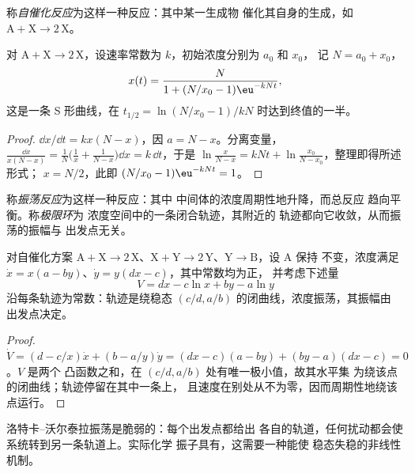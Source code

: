 \begin{definition}[自催化反应]\label{def:b3:complex-kinetics:autocatalysis}
称\emph{自催化反应}为这样一种反应：其中某一生成物
催化其自身的生成，如 $\mathrm{A + X \to 2\,X}$。
\end{definition}

\begin{proposition}[逻辑斯谛定律]\label{prop:b3:complex-kinetics:logistic}
对 $\mathrm{A + X \to 2\,X}$，设速率常数为 $k$，初始浓度分别为 $a_0$ 和 $x_0$，
记 $N = a_0 + x_0$，
\[
  x(t) = \frac{N}{1 + (N/x_0 - 1)\eu^{-kNt}},
\]
这是一条 S 形曲线，在 $t_{1/2} = \ln(N/x_0 - 1)/kN$ 时达到终值的一半。
\end{proposition}

\begin{proof}
$\dd x/\dd t = kx(N - x)$，因 $a = N - x$。分离变量，$\frac{\dd x}{x(N - x)} = \frac1N\bigl(\frac1x + \frac{1}{N - x}\bigr)\dd x
= k\,\dd t$，于是 $\ln\frac{x}{N - x} = kNt + \ln\frac{x_0}{N - x_0}$，整理即得所述形式；
$x = N/2$，此即 $(N/x_0 - 1)\eu^{-kNt} = 1$。
\end{proof}

\begin{definition}\label{def:b3:complex-kinetics:oscillating}
称\emph{振荡反应}为这样一种反应：其中
中间体的浓度周期性地升降，而总反应
趋向平衡。称\emph{极限环}为
浓度空间中的一条闭合轨迹，其附近的
轨迹都向它收敛，从而振荡的振幅与
出发点无关。
\end{definition}

\begin{theorem}\label{thm:b3:complex-kinetics:lotka-volterra}
对自催化方案 $\mathrm{A + X \to 2\,X}$、$\mathrm{X + Y \to 2\,Y}$、$\mathrm{Y \to B}$，设 A 保持
不变，浓度满足 $\dot x = x(a - by)$、$\dot y = y(dx - c)$，其中常数均为正，
并考虑下述量
\[
  V = dx - c\ln x + by - a\ln y
\]
沿每条轨迹为常数：轨迹是绕稳态
$(c/d, a/b)$ 的闭曲线，浓度振荡，其振幅由
出发点决定。
\end{theorem}

\begin{proof}
$\dot V = (d - c/x)\dot x + (b - a/y)\dot y = (dx - c)(a - by) + (by - a)(dx - c) = 0$。$V$ 是两个
凸函数之和，在 $(c/d, a/b)$ 处有唯一极小值，故其水平集
为绕该点的闭曲线；轨迹停留在其中一条上，
且速度在别处从不为零，因而周期性地绕该点运行。
\end{proof}

洛特卡–沃尔泰拉振荡是脆弱的：每个出发点都给出
各自的轨道，任何扰动都会使系统转到另一条轨道上。实际化学
振子具有，这需要一种能使
稳态失稳的非线性机制。

